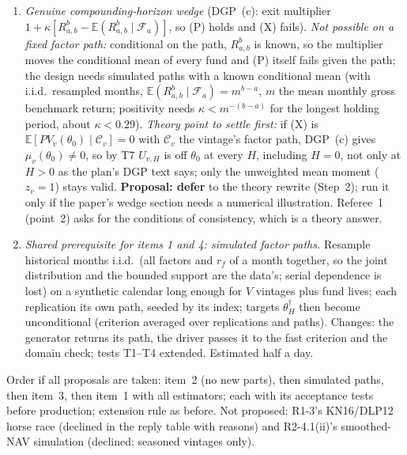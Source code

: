\documentclass[11pt]{article}
\newcommand{\E}{\mathbb{E}}
\newcommand{\C}{\mathcal{C}}
\newcommand{\F}{\mathcal{F}}
\begin{document}
\begin{itemize}
\begin{enumerate}
  \item \emph{Genuine compounding-horizon wedge} (DGP~(c): exit multiplier $1+\kappa[R^b_{a,b}-\E(R^b_{a,b}\mid\F_a)]$, so (P) holds and (X) fails). \emph{Not possible on a fixed factor path:} conditional on the path, $R^b_{a,b}$ is known, so the multiplier moves the conditional mean of every fund and (P) itself fails given the path; the design needs simulated paths with a known conditional mean (with i.i.d.\ resampled months, $\E(R^b_{a,b}\mid\F_a)=m^{b-a}$, $m$ the mean monthly gross benchmark return; positivity needs $\kappa<m^{-(b-a)}$ for the longest holding period, about $\kappa<0.29$). \emph{Theory point to settle first:} if (X) is $\E[PV_v(\theta_0)\mid\C_v]=0$ with $\C_v$ the vintage's factor path, DGP~(c) gives $\mu_v(\theta_0)\neq0$, so by T7 $U_{v,H}$ is off $\theta_0$ at every $H$, including $H=0$, not only at $H>0$ as the plan's DGP text says; only the unweighted mean moment ($z_v=1$) stays valid. \textbf{Proposal: defer} to the theory rewrite (Step~2); run it only if the paper's wedge section needs a numerical illustration. Referee~1 (point~2) asks for the conditions of consistency, which is a theory answer.
  \item \emph{Shared prerequisite for items 1 and 4: simulated factor paths.} Resample historical months i.i.d.\ (all factors and $r_f$ of a month together, so the joint distribution and the bounded support are the data's; serial dependence is lost) on a synthetic calendar long enough for $V$ vintages plus fund lives; each replication its own path, seeded by its index; targets $\theta_H^\dagger$ then become unconditional (criterion averaged over replications and paths). Changes: the generator returns its path, the driver passes it to the fast criterion and the domain check; tests T1--T4 extended. Estimated half a day.
  \end{enumerate}
  Order if all proposals are taken: item~2 (no new parts), then simulated paths, then item~3, then item~1 with all estimators; each with its acceptance tests before production; extension rule as before. Not proposed: R1-3's KN16/DLP12 horse race (declined in the reply table with reasons) and R2-4.1(ii)'s smoothed-NAV simulation (declined: seasoned vintages only).
\end{itemize}
\end{document}
